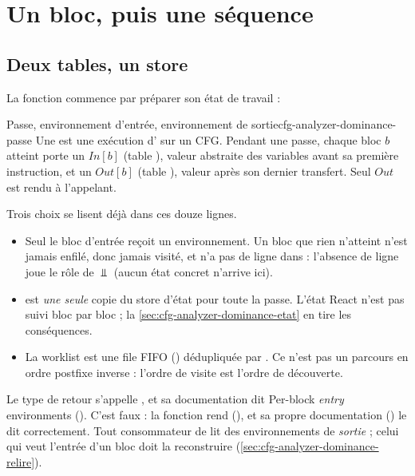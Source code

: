 \section{Un bloc, puis une séquence}
\label{sec:cfg-analyzer-dominance-bloc}

\subsection{Deux tables, un store}

La fonction commence par préparer son état de travail :


\begin{definition}{Passe, environnement d'entrée, environnement de sortie}{cfg-analyzer-dominance-passe}
  Une  est une exécution d' sur un CFG.
  Pendant une passe, chaque bloc $b$ atteint porte un  $\mathit{In}[b]$ (table ), valeur abstraite des
  variables avant sa première instruction, et un  $\mathit{Out}[b]$ (table ), valeur après son
  dernier transfert. Seul $\mathit{Out}$ est rendu à l'appelant.
\end{definition}

Trois choix se lisent déjà dans ces douze lignes.
\begin{itemize}
  \item Seul le bloc d'entrée reçoit un environnement. Un bloc que rien
    n'atteint n'est jamais enfilé, donc jamais visité, et n'a pas de ligne
    dans  : l'absence de ligne joue le rôle de $\Bot$
    (\og aucun état concret n'arrive ici\fg).
  \item {} est \emph{une seule} copie du store d'état pour toute
    la passe. L'état React n'est pas suivi bloc par bloc ; la
    \cref{sec:cfg-analyzer-dominance-etat} en tire les conséquences.
  \item La worklist est une file FIFO () dédupliquée par
    . Ce n'est pas un parcours en ordre postfixe inverse :
    l'ordre de visite est l'ordre de découverte.
\end{itemize}

\begin{piege}
  Le type de retour s'appelle , et sa documentation dit
  \og Per-block \emph{entry} environments\fg{}
  (). C'est faux : la fonction rend
   (), et sa propre
  documentation () le dit
  correctement. Tout consommateur de  lit des
  environnements de \emph{sortie} ; celui qui veut l'entrée d'un bloc doit la
  reconstruire (\cref{sec:cfg-analyzer-dominance-relire}).
\end{piege}

